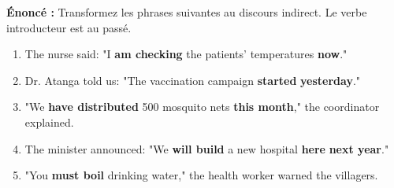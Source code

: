 \documentclass[11pt]{article}
\begin{document}
\begin{exoresolu}
\textbf{Énoncé :} Transformez les phrases suivantes au discours indirect. Le verbe introducteur est au passé.

\begin{enumerate}
    \item The nurse said: "I \textbf{am checking} the patients' temperatures \textbf{now}."
    \item Dr. Atanga told us: "The vaccination campaign \textbf{started} \textbf{yesterday}."
    \item "We \textbf{have distributed} 500 mosquito nets \textbf{this month}," the coordinator explained.
    \item The minister announced: "We \textbf{will build} a new hospital \textbf{here} \textbf{next year}."
    \item "You \textbf{must boil} drinking water," the health worker warned the villagers.
\end{enumerate}


\end{exoresolu}
\end{document}
